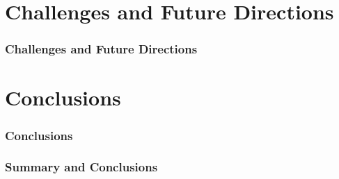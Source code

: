 \documentclass[10pt, pdf, xcolor=pdftex, dvipsnames, table]{beamer}
\begin{document}
\section[Challenges and Future Directions]{Challenges and Future Directions}

\begin{frame}
	\tableofcontents[currentsection]
\end{frame}

\begin{frame}
	\frametitle{Challenges and Future Directions}
\end{frame}

\section[Conclusions]{Conclusions}

\begin{frame}
	\tableofcontents[currentsection]
\end{frame}

\begin{frame}
	\frametitle{Conclusions}
\end{frame}

\begin{frame}
	\frametitle{Summary and Conclusions}
\end{frame}
\end{document}
